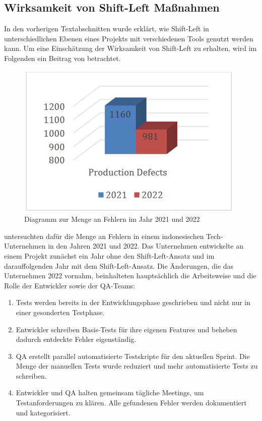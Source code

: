 \subsection{Wirksamkeit von Shift-Left Maßnahmen}

In den vorherigen Textabschnitten wurde erklärt, wie Shift-Left in unterschiedlichen Ebenen eines Projekts mit verschiedenen Tools genutzt werden kann. Um eine Einschätzung der Wirksamkeit von Shift-Left zu erhalten, wird im Folgenden ein Beitrag von \citet{andriadi_impact_2023} betrachtet.

\begin{figure}
\centering
\includegraphics[width=0.9\linewidth]{images/Impact_production_defects.png}
\caption{Diagramm zur Menge an Fehlern im Jahr 2021 und 2022 \cite{andriadi_impact_2023}}
\label{fig:production_defects }
\end{figure}

\citet{andriadi_impact_2023} untersuchten dafür die Menge an Fehlern in einem indonesischen Tech-Unternehmen in den Jahren 2021 und 2022. Das Unternehmen entwickelte an einem Projekt zunächst ein Jahr ohne den Shift-Left-Ansatz und im darauffolgenden Jahr mit dem Shift-Left-Ansatz. Die Änderungen, die das Unternehmen 2022 vornahm, beinhalteten hauptsächlich die Arbeitsweise und die Rolle der Entwickler sowie der QA-Teams:
\begin{enumerate}
\item Tests werden bereits in der Entwicklungsphase geschrieben und nicht nur in einer gesonderten Testphase.
\item Entwickler schreiben Basis-Tests für ihre eigenen Features und beheben dadurch entdeckte Fehler eigenständig.
\item QA erstellt parallel automatisierte Testskripte für den aktuellen Sprint. Die Menge der manuellen Tests wurde reduziert und mehr automatisierte Tests zu schreiben.
\item Entwickler und QA halten gemeinsam tägliche Meetings, um Testanforderungen zu klären. Alle gefundenen Fehler werden dokumentiert und kategorisiert.
\end{enumerate}

